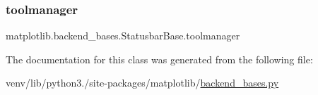 \subsubsection{\texorpdfstring{toolmanager}{toolmanager}}
{\footnotesize\ttfamily matplotlib.\+backend\+\_\+bases.\+Statusbar\+Base.\+toolmanager}



The documentation for this class was generated from the following file\+:\begin{DoxyCompactItemize}
\item 
venv/lib/python3./site-\/packages/matplotlib/\hyperlink{backend__bases_8py}{backend\+\_\+bases.\+py}\end{DoxyCompactItemize}
